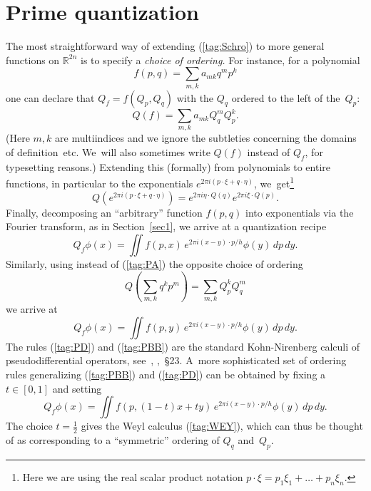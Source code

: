 \documentclass[11pt]{amsart}
\numberwithin{equation}{section}
\theoremstyle{remark}
\newcommand\RR{\mathbb R}
\begin{document}
\section{Prime quantization} \label{sec5}
The most straightforward way of extending (\ref{tag:Schro}) to more general
functions on $\RR^{2n}$ is to specify a {\sl choice of ordering.\/} For
instance, for a polynomial
\begin{equation}  f(p,q)= \sum_{m,k} a_{mk} q^m p^k  \label{tag:PO}
\end{equation}
one can declare that $Q_f=f(Q_p,Q_q)$ with the $Q_q$ ordered to the left of
the~$Q_p$:
\begin{equation}  Q(f) = \sum_{m,k} a_{mk} Q^m_q Q^k_p.  \label{tag:PA}
\end{equation}
(Here $m,k$ are multiindices and we ignore the subtleties concerning the
domains of definition~etc. We~will also sometimes write $Q(f)$ instead of
$Q_f$, for typesetting reasons.) Extending this (formally) from polynomials to
entire functions, in particular to the exponentials $e^{2\pi
i(p\cdot\xi+q\cdot\eta)}$, we~get\footnote{Here we are using the real scalar
product notation $p\cdot\xi=p_1\xi_1+\dots+p_n\xi_n$.}
$$ Q(e^{2\pi i(p\cdot\xi+q\cdot\eta)})
= e^{2\pi i \eta \cdot Q(q)} e^{2\pi i \xi\cdot Q(p)}.  $$
Finally, decomposing an ``arbitrary'' function $f(p,q)$ into exponentials via
the Fourier transform, as in Section~\ref{sec1}, we arrive at a quantization
recipe
\begin{equation}  Q_f \phi(x) = \iint f(p,x) \,e^{2\pi i(x-y)\cdot p /h}
\phi(y) \,d p \,dy. \label{tag:PBB}  \end{equation}
Similarly, using instead of (\ref{tag:PA}) the opposite choice of ordering
\begin{equation}  Q(\sum_{m,k} q^k p^m) = \sum_{m,k} Q_p^k Q_q^m
\label{tag:PC}  \end{equation}
we arrive at
\begin{equation}  Q_f \phi(x) = \iint f(p,y) \,e^{2\pi i(x-y)\cdot p /h}
\phi(y) \,d p \,dy. \label{tag:PD}  \end{equation}
The rules (\ref{tag:PD}) and (\ref{tag:PBB}) are the standard Kohn-Nirenberg
calculi of pseudodifferential operators, see~\cite{bib:KN},
\cite{bib:Foll},~\S23. A~more sophisticated set of ordering rules generalizing
(\ref{tag:PBB}) and (\ref{tag:PD}) can be obtained by fixing a $t\in[0,1]$ and
setting
\begin{equation}  Q_f \phi(x) = \iint f(p,(1-t)x+ty)\,e^{2\pi i(x-y)\cdot p /h}
\phi(y)  \,d p \,dy.  \label{tag:PU}  \end{equation}
The choice $t=\frac12$ gives the Weyl calculus (\ref{tag:WEY}), which can thus
be thought of as corresponding to a ``symmetric'' ordering of $Q_q$ and~$Q_p$.
\end{document}
